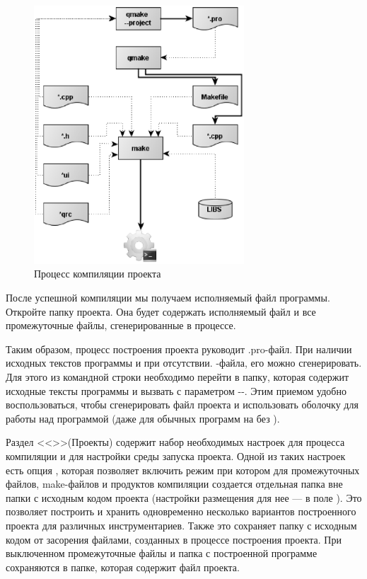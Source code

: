 \begin{figure}[htb]
\begin{center}
\includegraphics[width=0.7\textwidth]{img/ris_12_1}
\caption{Процесс компиляции проекта}
\label{ch12:refDrawing0}
\end{center}
\end{figure}

После успешной компиляции мы получаем исполняемый файл программы. Откройте папку проекта. Она будет
содержать исполняемый файл и все промежуточные файлы, сгенерированные в процессе.

Таким образом, процесс построения проекта руководит .pro-файл. При наличии исходных текстов программы и
при отсутствии. -файла, его можно сгенерировать. Для этого из командной строки
необходимо перейти в папку, которая содержит исходные тексты программы и вызвать 
с параметром -{-}. Этим приемом удобно
воспользоваться, чтобы сгенерировать файл проекта и использовать оболочку 
для работы над программой (даже для обычных программ на  без ).

Раздел <<>>(Проекты) содержит набор
необходимых настроек для процесса компиляции и для настройки среды запуска проекта. Одной
из таких настроек есть опция , которая 
позволяет включить режим при котором для промежуточных файлов,
make-файлов и продуктов компиляции создается отдельная папка вне папки с исходным кодом проекта
(настройки размещения для нее --- в поле ). Это позволяет построить и
хранить одновременно несколько вариантов построенного проекта для различных инструментариев. Также это сохраняет папку
с исходным кодом от засорения файлами, созданных в процессе построения проекта. При выключенном  промежуточные файлы и папка с построенной программе сохраняются в папке, которая содержит файл
проекта.

